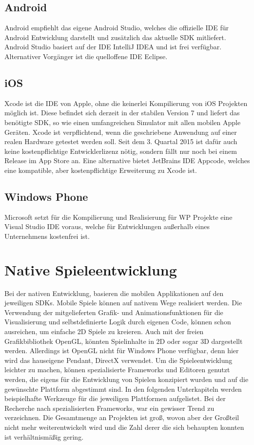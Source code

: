 \subsection{Android}
Android empfiehlt das eigene Android Studio, welches die offizielle IDE für Android Entwicklung darstellt und zusätzlich das aktuelle SDK mitliefert. Android Studio basiert auf der IDE IntelliJ IDEA und ist frei verfügbar.\citep{android_studio} Alternativer Vorgänger ist die quelloffene IDE Eclipse.

\subsection{iOS}
Xcode ist die IDE von Apple, ohne die keinerlei Kompilierung von iOS Projekten möglich ist.
Diese befindet sich derzeit in der stabilen Version 7 und liefert das benötigte SDK, so wie einen umfangreichen Simulator mit allen mobilen Apple Geräten. Xcode ist verpflichtend, wenn die geschriebene Anwendung auf einer realen Hardware getestet werden soll. Seit dem 3. Quartal 2015 ist dafür auch keine kostenpflichtige Entwicklerlizenz nötig, sondern fällt nur noch bei einem Release im App Store an. 
\citep{t3n_xcode7}
Eine alternative bietet JetBrains IDE Appcode, welches eine kompatible, aber kostenpflichtige Erweiterung zu Xcode ist.
\citep{appcode}


\subsection{Windows Phone}
Microsoft setzt für die Kompilierung und Realisierung für WP Projekte eine Visual Studio IDE voraus, welche für Entwicklungen außerhalb eines Unternehmens kostenfrei ist.


\section{Native Spieleentwicklung}
Bei der nativen Entwicklung, basieren die mobilen Applikationen auf den jeweiligen SDKs. Mobile Spiele können auf nativem Wege realisiert werden. Die Verwendung der mitgelieferten Grafik- und Animationsfunktionen für die Visualisierung und selbstdefinierte Logik durch eigenen Code, können schon ausreichen, um einfache 2D Spiele zu kreieren. Auch mit der freien Grafikbibliothek OpenGL, könnten Spielinhalte in 2D oder sogar 3D dargestellt werden. Allerdings ist OpenGL nicht für Windows Phone verfügbar, denn hier wird das hauseigene Pendant, DirectX verwendet. Um die Spieleentwicklung leichter zu machen, können spezialisierte Frameworks und Editoren genutzt werden, die eigens für die Entwicklung von Spielen konzipiert wurden und auf die gewünschte Plattform abgestimmt sind. In den folgenden Unterkapiteln werden beispielhafte Werkzeuge für die jeweiligen Plattformen aufgelistet. Bei der Recherche nach spezialisierten Frameworks, war ein gewisser Trend zu verzeichnen. Die Gesamtmenge an Projekten ist groß, wovon aber der Großteil nicht mehr weiterentwickelt wird und die Zahl derer die sich behaupten konnten ist verhältnismäßig gering.
 
